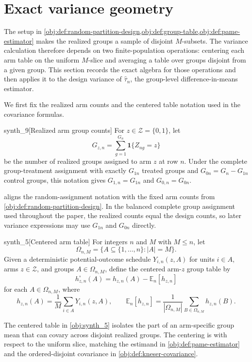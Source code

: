 \section{Exact variance geometry}\label{sec:exact-variance}

The setup in \cref{obj:def:random-partition-design,obj:def:group-table,obj:def:pame-estimator} makes the realized groups a sample of disjoint \(M\)-subsets. The variance calculation therefore depends on two finite-population operations: centering each arm table on the uniform \(M\)-slice and averaging a table over groups disjoint from a given group. This section records the exact algebra for those operations and then applies it to the design variance of \(\widehat\tau_n\), the group-level difference-in-means estimator.

We first fix the realized arm counts and the centered table notation used in the covariance formulas.

\begin{definitionv}{synth_9}[Realized arm group counts]
For \(z\in\mathcal Z=\{0,1\}\), let
\[
G_{z,n}=\sum_{g=1}^{G_n}\mathbf 1\{Z_{ng}=z\}
\]
be the number of realized groups assigned to arm \(z\) at row \(n\). Under the complete group-treatment assignment with exactly \(G_{1n}\) treated groups and \(G_{0n}=G_n-G_{1n}\) control groups, this notation gives \(G_{1,n}=G_{1n}\) and \(G_{0,n}=G_{0n}\).
\end{definitionv}

 aligns the random-assignment notation with the fixed arm counts from \cref{obj:def:random-partition-design}. In the balanced complete group assignment used throughout the paper, the realized counts equal the design counts, so later variance expressions may use \(G_{1n}\) and \(G_{0n}\) directly.

\begin{definitionv}{synth_5}[Centered arm table]
For integers \(n\) and \(M\) with \(M\le n\), let
\[
\Omega_{n,M}=\{A\subseteq \{1,\ldots,n\}: |A|=M\}.
\]
Given a deterministic potential-outcome schedule \(Y_{i,n}(z,A)\) for units \(i\in A\), arms \(z\in\mathcal Z\), and groups \(A\in\Omega_{n,M}\), define the centered arm-\(z\) group table by
\[
h_{z,n}^{\circ}(A)
=
h_{z,n}(A)-\mathbb E_n[h_{z,n}]
\]
for each \(A\in\Omega_{n,M}\), where
\[
h_{z,n}(A)=\frac{1}{M}\sum_{i\in A}Y_{i,n}(z,A),
\qquad
\mathbb E_n[h_{z,n}]
=
\frac{1}{|\Omega_{n,M}|}\sum_{B\in\Omega_{n,M}} h_{z,n}(B).
\]
\end{definitionv}

The centered table in \cref{obj:synth_5} isolates the part of an arm-specific group mean that can covary across disjoint realized groups. The centering is with respect to the uniform slice, matching the estimand in \cref{obj:def:pame-estimator} and the ordered-disjoint covariance in \cref{obj:def:kneser-covariance}.

